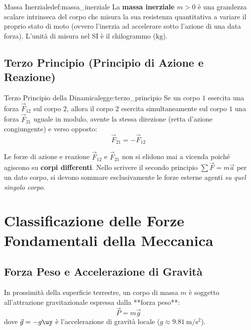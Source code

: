 \begin{definizione}{Massa Inerziale}{def:massa_inerziale}
La \textbf{massa inerziale} $m > 0$ è una grandezza scalare intrinseca del corpo che misura la sua resistenza quantitativa a variare il proprio stato di moto (ovvero l'inerzia ad accelerare sotto l'azione di una data forza). L'unità di misura nel SI è il chilogrammo ($\si{\kilogram}$).
\end{definizione}

\subsection{Terzo Principio (Principio di Azione e Reazione)}

\begin{legge}{Terzo Principio della Dinamica}{legge:terzo_principio}
Se un corpo $1$ esercita una forza $\vec{F}_{12}$ sul corpo $2$, allora il corpo $2$ esercita simultaneamente sul corpo $1$ una forza $\vec{F}_{21}$ uguale in modulo, avente la stessa direzione (retta d'azione congiungente) e verso opposto:
\begin{equation}
    \vec{F}_{21} = -\vec{F}_{12}
    \label{eq:terzo_principio}
\end{equation}
\end{legge}

\begin{esame}
Le forze di azione e reazione $\vec{F}_{12}$ e $\vec{F}_{21}$ non si elidono mai a vicenda poiché agiscono su \textbf{corpi differenti}. Nello scrivere il secondo principio $\sum\vec{F} = m\vec{a}$ per un dato corpo, si devono sommare esclusivamente le forze esterne agenti \emph{su quel singolo corpo}.
\end{esame}

\section{Classificazione delle Forze Fondamentali della Meccanica}
\label{sec:forze_meccanica}

\subsection{Forza Peso e Accelerazione di Gravità}
In prossimità della superficie terrestre, un corpo di massa $m$ è soggetto all'attrazione gravitazionale espressa dalla **forza peso**:
\begin{equation}
    \vec{P} = m\vec{g}
\end{equation}
dove $\vec{g} = -g\uy$ è l'accelerazione di gravità locale ($g \approx \SI{9.81}{\metre\per\second\squared}$).

